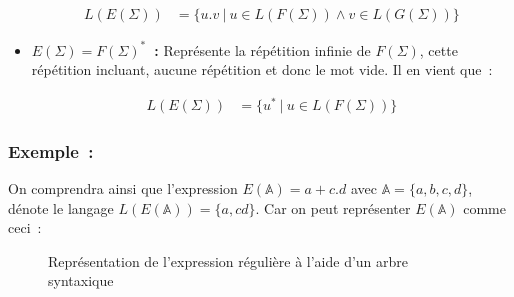 \documentclass[12pt]{article}
\begin{document}
\begin{itemize}
        \begin{align}
            L(E(\Sigma)) & = \{u.v ~|~ u \in L(F(\Sigma)) \land v \in L(G(\Sigma)) \}
        \end{align}

        \vphantom{}

    \item[\textbullet] \textbf{\(E(\Sigma) = F(\Sigma)^* \)~:} Représente la
        répétition infinie de \(F(\Sigma)\), cette répétition incluant, aucune
        répétition et donc le mot vide. Il en vient que~:

        \begin{align}
            L(E(\Sigma)) & = \{u^* ~|~ u \in L(F(\Sigma))\}
        \end{align}
\end{itemize}

\subsubsection*{Exemple~:}

On comprendra ainsi que l'expression \(E(\mathbb{A}) = a+c.d\) avec
\(\mathbb{A} = \{a, b, c, d\}\), dénote le langage \(L(E(\mathbb{A})) = \{a,
cd\}\). Car on peut représenter \(E(\mathbb{A})\) comme ceci~:

\begin{figure}[H]
    \centering
    \caption{
        Représentation de l'expression régulière à l'aide d'un arbre syntaxique
    }\label{fig:arbre_syn}
\end{figure}
\end{document}
